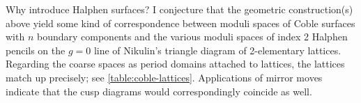 \documentclass[../../main.tex]{subfiles}
\begin{document}
\begin{remark}
Why introduce Halphen surfaces? I conjecture that the geometric construction(s) above yield some kind of correspondence between moduli spaces of Coble surfaces with $n$ boundary components and the various moduli spaces of index 2 Halphen pencils on the $g=0$ line of Nikulin's triangle diagram of 2-elementary lattices. Regarding the coarse spaces as period domains attached to lattices, the lattices match up precisely; see \cref{table:coble-lattices}. Applications of mirror moves indicate that the cusp diagrams would correspondingly coincide as well.
\end{remark}
\end{document}
